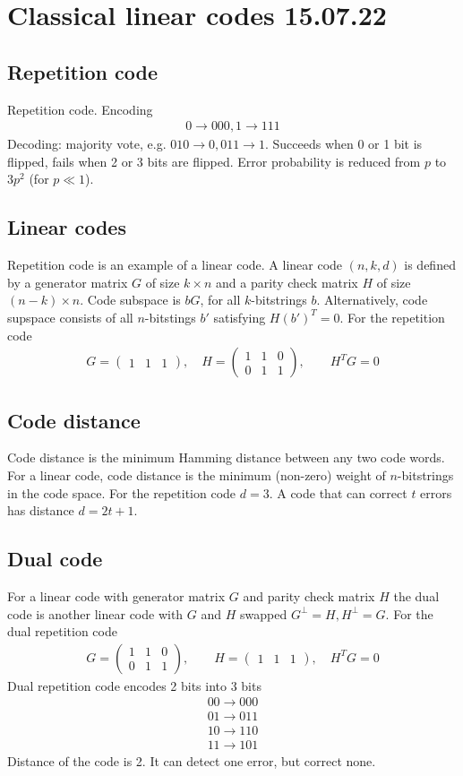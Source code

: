 \documentclass[12 pt]{article}
\begin{document}
\section{Classical linear codes 15.07.22}
\subsection{Repetition code}
Repetition code. Encoding
\begin{align}
0\to000, 1\to111
\end{align}
Decoding: majority vote, e.g. $010\to0, 011\to1$. Succeeds when 0 or 1 bit is flipped, fails when 2 or 3 bits are flipped. Error probability is reduced from $p$ to $3p^2$ (for $p\ll1$).
\subsection{Linear codes}
Repetition code is an example of a linear code. A linear code $(n, k, d)$ is defined by a generator matrix $G$ of size $k\times n$ and a parity check matrix $H$ of size $(n-k)\times n$. Code subspace is $bG$, for all $k$-bitstrings $b$. Alternatively, code supspace consists of all $n$-bitstings $b'$ satisfying $H(b')^T=0$. For the repetition code
\begin{align}
G=\begin{pmatrix}1&1&1\end{pmatrix},\quad H=\begin{pmatrix}1&1&0\\0&1&1\end{pmatrix},\qquad H^T G=0
\end{align}
\subsection{Code distance}
Code distance is the minimum Hamming distance between any two code words. For a linear code, code distance is the minimum (non-zero) weight of $n$-bitstrings in the code space. For the repetition code $d=3$. A code that can correct $t$ errors has distance $d=2t+1$.
\subsection{Dual code}
For a linear code with generator matrix $G$ and parity check matrix $H$ the dual code is another linear code with $G$ and $H$ swapped $G^{\perp}=H, H^{\perp}=G$. For the dual repetition code
\begin{align}
G=\begin{pmatrix}1&1&0\\0&1&1\end{pmatrix},\qquad H=\begin{pmatrix}1&1&1\end{pmatrix},\quad H^TG=0
\end{align}
Dual repetition code encodes 2 bits into 3 bits
\begin{align}
00\to 000\\
01\to 011\\
10\to 110\\
11\to 101
\end{align}
Distance of the code is 2. It can detect one error, but correct none.
\end{document}
